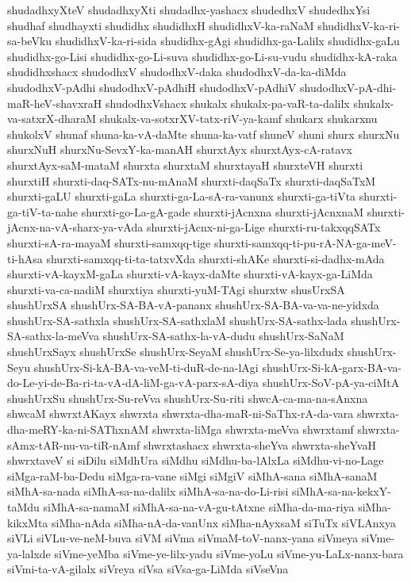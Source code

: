 {shudadhxyXteV
shudadhxyXti
shudadhx-yashacx
shudedhxV
shudedhxYsi
shudhaf
shudhayxti
shudidhx
shudidhxH
shudidhxV-ka-raNaM
shudidhxV-ka-ri-sa-beVku
shudidhxV-ka-ri-sida
shudidhx-gAgi
shudidhx-ga-Lalilx
shudidhx-gaLu
shudidhx-go-Lisi
shudidhx-go-Li-suva
shudidhx-go-Li-su-vudu
shudidhx-kA-raka
shudidhxshacx
shudodhxV
shudodhxV-daka
shudodhxV-da-ka-diMda
shudodhxV-pAdhi
shudodhxV-pAdhiH
shudodhxV-pAdhiV
shudodhxV-pA-dhi-maR-heV-shavxraH
shudodhxVshacx
shukalx
shukalx-pa-vaR-ta-dalilx
shukalx-va-satxrX-dharaM
shukalx-va-sotxrXV-tatx-riV-ya-kamf
shukarx
shukarxnu
shukolxV
shunaf
shuna-ka-vA-daMte
shuna-ka-vatf
shuneV
shuni
shurx
shurxNu
shurxNuH
shurxNu-SevxY-ka-manAH
shurxtAyx
shurxtAyx-cA-ratavx
shurxtAyx-saM-mataM
shurxta
shurxtaM
shurxtayaH
shurxteVH
shurxti
shurxtiH
shurxti-daq-SATx-nu-mAnaM
shurxti-daqSaTx
shurxti-daqSaTxM
shurxti-gaLU
shurxti-gaLa
shurxti-ga-La-sA-ra-vanunx
shurxti-ga-tiVta
shurxti-ga-tiV-ta-nahe
shurxti-go-La-gA-gade
shurxti-jAcnxna
shurxti-jAcnxnaM
shurxti-jAcnx-na-vA-sharx-ya-vAda
shurxti-jAcnx-ni-ga-Lige
shurxti-ru-takxqqSATx
shurxti-sA-ra-mayaM
shurxti-samxqq-tige
shurxti-samxqq-ti-pu-rA-NA-ga-meV-ti-hAsa
shurxti-samxqq-ti-ta-tatxvXda
shurxti-shAKe
shurxti-si-dadhx-mAda
shurxti-vA-kayxM-gaLa
shurxti-vA-kayx-daMte
shurxti-vA-kayx-ga-LiMda
shurxti-va-ca-nadiM
shurxtiya
shurxti-yuM-TAgi
shurxtw
shusUrxSA
shushUrxSA
shushUrx-SA-BA-vA-pananx
shushUrx-SA-BA-va-va-ne-yidxda
shushUrx-SA-sathxla
shushUrx-SA-sathxlaM
shushUrx-SA-sathx-lada
shushUrx-SA-sathx-la-meVva
shushUrx-SA-sathx-la-vA-dudu
shushUrx-SaNaM
shushUrxSayx
shushUrxSe
shushUrx-SeyaM
shushUrx-Se-ya-lilxdudx
shushUrx-Seyu
shushUrx-Si-kA-BA-va-veM-ti-duR-de-na-lAgi
shushUrx-Si-kA-garx-BA-va-do-Le-yi-de-Ba-ri-ta-vA-dA-liM-ga-vA-parx-sA-diya
shushUrx-SoV-pA-ya-ciMtA
shushUrxSu
shushUrx-Su-reVva
shushUrx-Su-riti
shwcA-ca-ma-na-sAnxna
shwcaM
shwrxtAKayx
shwrxta
shwrxta-dha-maR-ni-SaThx-rA-da-vara
shwrxta-dha-meRY-ka-ni-SAThxnAM
shwrxta-liMga
shwrxta-meVva
shwrxtamf
shwrxta-sAmx-tAR-nu-va-tiR-nAmf
shwrxtashacx
shwrxta-sheYva
shwrxta-sheYvaH
shwrxtaveV
si
siDilu
siMdhUra
siMdhu
siMdhu-ba-lAlxLa
siMdhu-vi-no-Lage
siMga-raM-ba-Dedu
siMga-ra-vane
siMgi
siMgiV
siMhA-sana
siMhA-sanaM
siMhA-sa-nada
siMhA-sa-na-dalilx
siMhA-sa-na-do-Li-risi
siMhA-sa-na-kekxY-taMdu
siMhA-sa-namaM
siMhA-sa-na-vA-gu-tAtxne
siMha-da-ma-riya
siMha-kikxMta
siMha-nAda
siMha-nA-da-vanUnx
siMha-nAyxsaM
siTuTx
siVLAnxya
siVLi
siVLu-ve-neM-buva
siVM
siVma
siVmaM-toV-nanx-yana
siVmeya
siVme-ya-lalxde
siVme-yeMba
siVme-ye-lilx-yadu
siVme-yoLu
siVme-yu-LaLx-nanx-bara
siVmi-ta-vA-gilalx
siVreya
siVsa
siVsa-ga-LiMda
siVseVna
}
